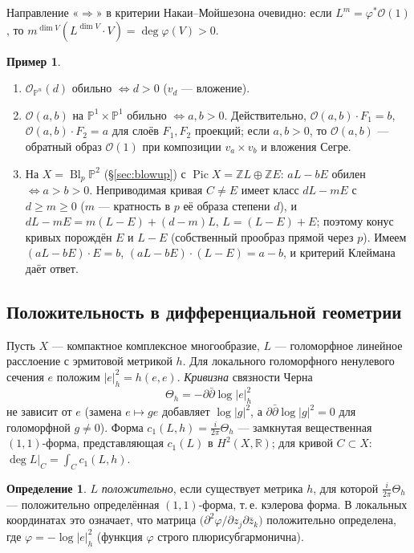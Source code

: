 \documentclass[11pt,a4paper]{article}
\theoremstyle{plain}
\theoremstyle{definition}
\newtheorem{definition}[theorem]{Определение}
\newtheorem{example}[theorem]{Пример}
\theoremstyle{remark}
\newcommand{\Z}{\mathbb{Z}}
\newcommand{\R}{\mathbb{R}}
\newcommand{\PP}{\mathbb{P}}
\newcommand{\cO}{\mathcal{O}}
\DeclareMathOperator{\Pic}{Pic}
\DeclareMathOperator{\Bl}{Bl}
\begin{document}
Направление «$\Rightarrow$» в критерии Накаи--Мойшезона очевидно: если $L^m=\varphi^*\cO(1)$, то
$m^{\dim V}(L^{\dim V}\cdot V)=\deg\varphi(V)>0$.

\begin{example}\label{ex:ample-examples}
\begin{enumerate}
\item $\cO_{\PP^n}(d)$ обильно $\iff d>0$ ($v_d$ --- вложение).
\item $\cO(a,b)$ на $\PP^1\times\PP^1$ обильно $\iff a,b>0$. Действительно, $\cO(a,b)\cdot F_1=b$,
$\cO(a,b)\cdot F_2=a$ для слоёв $F_1,F_2$ проекций; если $a,b>0$, то $\cO(a,b)$ --- обратный образ $\cO(1)$
при композиции $v_a\times v_b$ и вложения Сегре.
\item На $X=\Bl_p\PP^2$ (\S\ref{sec:blowup}) с $\Pic X=\Z L\oplus\Z E$: $aL-bE$ обилен $\iff a>b>0$.
Неприводимая кривая $C\ne E$ имеет класс $dL-mE$ с $d\ge m\ge0$ ($m$ --- кратность в $p$ её образа
степени $d$), и $dL-mE=m(L-E)+(d-m)L$, $L=(L-E)+E$; поэтому конус кривых порождён $E$ и $L-E$
(собственный прообраз прямой через $p$). Имеем $(aL-bE)\cdot E=b$, $(aL-bE)\cdot(L-E)=a-b$, и критерий
Клеймана даёт ответ.
\end{enumerate}
\end{example}

\subsection{Положительность в дифференциальной геометрии}

Пусть $X$ --- компактное комплексное многообразие, $L$ --- голоморфное линейное расслоение с
эрмитовой метрикой $h$. Для локального голоморфного ненулевого сечения $e$ положим $|e|_h^2=h(e,e)$.
\emph{Кривизна} связности Черна
\[
\Theta_h=-\partial\bar\partial\log|e|_h^2
\]
не зависит от $e$ (замена $e\mapsto ge$ добавляет $\log|g|^2$, а $\partial\bar\partial\log|g|^2=0$ для
голоморфной $g\ne0$). Форма $c_1(L,h)=\frac{i}{2\pi}\Theta_h$ --- замкнутая вещественная $(1,1)$-форма,
представляющая $c_1(L)$ в $H^2(X,\R)$; для кривой $C\subset X$: $\deg L|_C=\int_Cc_1(L,h)$.

\begin{definition}
$L$ \emph{положительно}, если существует метрика $h$, для которой $\frac{i}{2\pi}\Theta_h$ --- положительно
определённая $(1,1)$-форма, т.\,е. кэлерова форма. В локальных координатах это означает, что матрица
$\big(\partial^2\varphi/\partial z_j\partial\bar z_k\big)$ положительно определена, где
$\varphi=-\log|e|^2_h$ (функция $\varphi$ строго плюрисубгармонична).
\end{definition}
\end{document}
